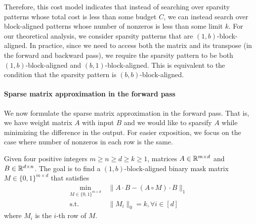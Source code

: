 Therefore, this cost model indicates that instead of searching over sparsity patterns whose total cost is less than some budget $C$, we can instead search over block-aligned patterns whose number of nonzeros is less than some limit $k$.
For our theoretical analysis, we consider sparsity patterns that are $(1, b)$-block-aligned.
In practice, since we need to access both the matrix and its transpose (in the forward and backward pass), we require the sparsity pattern to be both $(1, b)$-block-aligned and $(b, 1)$-block-aligned.
This is equivalent to the condition that the sparsity pattern is $(b, b)$-block-aligned.

\paragraph{Sparse matrix approximation in the forward pass}
We now formulate the sparse matrix approximation in the forward pass.
That is, we have weight matrix $A$ with input $B$ and we would like to sparsify $A$ while minimizing the difference in the output.
For easier exposition, we focus on the case where number of nonzeros in each row is the same.
 \begin{definition}\label{def:sparse_mask_factorization_before:informal}
Given four positive integers $m \geq n \geq d \geq k \geq 1$, matrices $A \in \mathbb{R}^{m \times d}$ and $B \in \mathbb{R}^{d\times n}$. The goal is to find a $(1, b)$-block-aligned binary mask matrix $M\in \{0, 1\}^{m \times d}$ that satisfies
\begin{align*}
     \min_{M \in \{0,1\}^{m \times d} } & ~ \| A \cdot B - (A \circ M) \cdot B \|_1 \\
    \mathrm{s.t.} & ~ \| M_{i} \|_0 = k , \forall i \in [d]
\end{align*}
where $M_i$ is the $i$-th row of $M$.
\end{definition}

